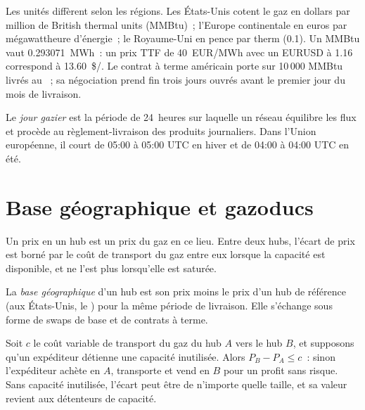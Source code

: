 Les unités diffèrent selon les régions. Les États-Unis cotent le gaz en dollars par million de
British thermal units (MMBtu)~; l'Europe continentale en euros par mégawattheure d'énergie~; le
Royaume-Uni en pence par therm (\qty{0.1}{\mmbtu}). Un MMBtu vaut \qty{0.293071}{MWh}~:
un prix TTF de \qty{40}{EUR/MWh} avec un EURUSD à 1.16 correspond à \qty{13.60}{\$/\mmbtu}. Le
contrat à terme américain porte sur 10\,000 MMBtu livrés au ~; sa négociation prend fin
trois jours ouvrés avant le premier jour du mois de livraison.

\begin{definition}\label{def:m3:natural-gas-and-lng:gasday}
Le \emph{jour gazier} est la période de 24~heures sur laquelle un réseau équilibre
les flux et procède au règlement-livraison des produits journaliers. Dans l'Union européenne, il court
de 05:00 à 05:00 UTC en hiver et de 04:00 à 04:00 UTC en été.
\end{definition}

\section{Base géographique et gazoducs}

Un prix en un hub est un prix du gaz en ce lieu. Entre deux hubs, l'écart de prix
est borné par le coût de transport du gaz entre eux lorsque la capacité est disponible, et
ne l'est plus lorsqu'elle est saturée.

\begin{definition}\label{def:m3:natural-gas-and-lng:basis}
La \emph{base géographique} d'un hub est son prix moins le
prix d'un hub de référence (aux États-Unis, le ) pour la même période de livraison. Elle
s'échange sous forme de swaps de base et de contrats à terme.
\end{definition}

\begin{proposition}\label{prop:m3:natural-gas-and-lng:basis}
Soit $c$ le coût variable de transport du gaz du hub $A$ vers le hub $B$, et supposons qu'un
expéditeur détienne une capacité inutilisée. Alors $P_B - P_A \le c$~: sinon l'expéditeur achète en
$A$, transporte et vend en $B$ pour un profit sans risque. Sans capacité inutilisée, l'écart
peut être de n'importe quelle taille, et sa valeur revient aux détenteurs de capacité.
\end{proposition}

